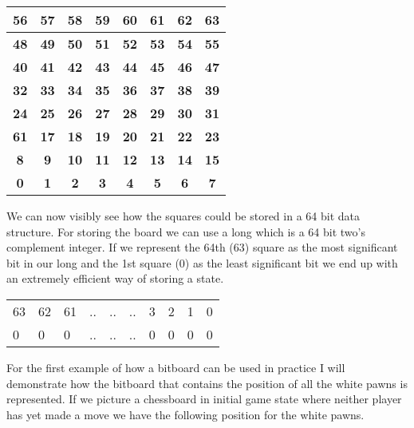 \documentclass[11pt]{report}
\begin{document}
\begin{table}[H]
\centering
\begin{tabular}{|c|c|c|c|c|c|c|c|}
\hline
\textbf{56} & \textbf{57} & \textbf{58} & \textbf{59} & \textbf{60} & \textbf{61} & \textbf{62} & \textbf{63} \\ \hline
\textbf{48} & \textbf{49} & \textbf{50} & \textbf{51} & \textbf{52} & \textbf{53} & \textbf{54} & \textbf{55} \\ \hline
\textbf{40} & \textbf{41} & \textbf{42} & \textbf{43} & \textbf{44} & \textbf{45} & \textbf{46} & \textbf{47} \\ \hline
\textbf{32} & \textbf{33} & \textbf{34} & \textbf{35} & \textbf{36} & \textbf{37} & \textbf{38} & \textbf{39} \\ \hline
\textbf{24} & \textbf{25} & \textbf{26} & \textbf{27} & \textbf{28} & \textbf{29} & \textbf{30} & \textbf{31} \\ \hline
\textbf{61} & \textbf{17} & \textbf{18} & \textbf{19} & \textbf{20} & \textbf{21} & \textbf{22} & \textbf{23} \\ \hline
\textbf{8}  & \textbf{9}  & \textbf{10} & \textbf{11} & \textbf{12} & \textbf{13} & \textbf{14} & \textbf{15} \\ \hline
\textbf{0}  & \textbf{1}  & \textbf{2}  & \textbf{3}  & \textbf{4}  & \textbf{5}  & \textbf{6}  & \textbf{7}  \\ \hline
\end{tabular}
\end{table}

We can now visibly see how the squares could be stored in a 64 bit data structure. For storing the board we can use a long which is a 64 bit two's complement integer. If we represent the 64th (63) square as the most significant bit in our long and the 1st square (0) as the least significant bit we end up with an extremely efficient way of storing a state.

\begin{table}[H]
\begin{tabular}{llllllllll}
63 & 62 & 61 & .. & .. & .. & 3 & 2  & 1 & 0 \\
0  & 0  & 0  & .. & .. & .. & 0 & 0 & 0 & 0
\end{tabular}
\end{table}

For the first example of how a bitboard can be used in practice I will demonstrate how the bitboard that contains the position of all the white pawns is represented. If we picture a chessboard in initial game state where neither player has yet made a move we have the following position for the white pawns.
\end{document}
